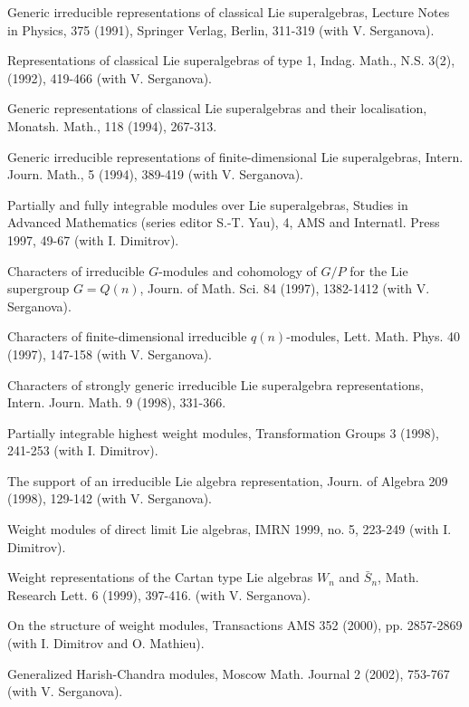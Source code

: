 \myss \label{17.}  Generic irreducible representations of
classical Lie superalgebras, Lecture Notes in Physics, 375 (1991),
Springer Verlag, Berlin, 311-319 (with V. Serga\-nova).

\myss \label{18.}  Representations of classical Lie superalgebras
of type 1, Indag. Math., N.S. 3(2), (1992), 419-466 (with V.
Serganova).

\myss \label{19.}  Generic representations of classical Lie
superalgebras and their localisation, Monatsh. Math., 118 (1994),
267-313.

\myss \label{20.}  Generic irreducible representations of
finite-dimensional Lie superalgebras, Intern. Journ. Math., 5
(1994), 389-419 (with V. Serganova).

\myss \label{21.}  Partially and fully integrable modules over Lie
superalgebras, Studies in Advanced Mathematics (series editor
S.-T. Yau), 4, AMS and Internatl. Press 1997, 49-67 (with I.
Dimitrov).

\myss \label{22.}  Characters of irreducible $G$-modules and
cohomology of $G/P$ for the Lie supergroup $G=Q(n)$, Journ. of
Math. Sci. 84 (1997), 1382-1412 (with V. Serganova).

\myss \label{23.}  Characters of finite-dimensional irreducible
$q(n)$-modules, Lett. Math. Phys.  40 (1997), 147-158 (with V.
Serganova).

\myss \label{24.}  Characters of strongly generic irreducible Lie
superalgebra representations, Intern. Journ. Math. 9 (1998),
331-366.

\myss \label{25.}  Partially integrable highest weight modules,
Transformation Groups 3 (1998), 241-253 (with I. Dimitrov).

\myss \label{26.}  The support of an irreducible Lie algebra
representation, Journ. of Algebra 209 (1998), 129-142 (with V.
Serganova).

\myss \label{27.} Weight modules of direct limit Lie algebras,
IMRN 1999, no. 5, 223-249  (with I. Dimitrov).

\myss \label{28.} Weight representations of the Cartan type Lie
algebras $W_n$ and $\bar{S}_n$, Math. Research Lett. 6 (1999),
397-416. (with V. Serganova).

\myss \label{29.}  On the structure of weight modules,
Transactions AMS 352 (2000), pp. 2857-2869 (with I. Dimitrov and O.
Mathieu).

\myss \label{30.} Generalized Harish-Chandra modules, Moscow Math.
Journal 2 (2002), 753-767 (with V. Serganova).

